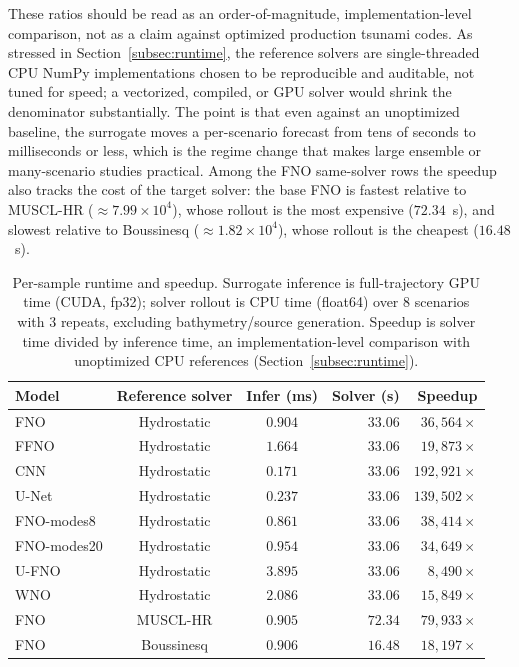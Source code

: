 These ratios should be read as an order-of-magnitude, implementation-level comparison, not as a claim against optimized production tsunami codes. As stressed in Section~\ref{subsec:runtime}, the reference solvers are single-threaded CPU NumPy implementations chosen to be reproducible and auditable, not tuned for speed; a vectorized, compiled, or GPU solver would shrink the denominator substantially. The point is that even against an unoptimized baseline, the surrogate moves a per-scenario forecast from tens of seconds to milliseconds or less, which is the regime change that makes large ensemble or many-scenario studies practical. Among the FNO same-solver rows the speedup also tracks the cost of the target solver: the base FNO is fastest relative to MUSCL-HR ($\approx 7.99 \times 10 ^ {4}$), whose rollout is the most expensive ($72.34$~s), and slowest relative to Boussinesq ($\approx 1.82 \times 10 ^ {4}$), whose rollout is the cheapest ($16.48$~s).

\begin{table}[!htbp]
\centering
\caption{Per-sample runtime and speedup. Surrogate inference is full-trajectory GPU time (CUDA, fp32); solver rollout is CPU time (float64) over $8$ scenarios with $3$ repeats, excluding bathymetry/source generation. Speedup is solver time divided by inference time, an implementation-level comparison with unoptimized CPU references (Section~\ref{subsec:runtime}).}
\label{tab:speed}
\begin{tabular}{lccrr}
    \toprule
    Model & Reference solver & Infer (ms) & Solver (s) & Speedup \\
    \midrule
    FNO         & Hydrostatic & $0.904$ & $33.06$ & $36{,}564  \times$ \\
    FFNO        & Hydrostatic & $1.664$ & $33.06$ & $19{,}873  \times$ \\
    CNN         & Hydrostatic & $0.171$ & $33.06$ & $192{,}921 \times$ \\
    U-Net       & Hydrostatic & $0.237$ & $33.06$ & $139{,}502 \times$ \\
    FNO-modes8  & Hydrostatic & $0.861$ & $33.06$ & $38{,}414  \times$ \\
    FNO-modes20 & Hydrostatic & $0.954$ & $33.06$ & $34{,}649  \times$ \\
    U-FNO       & Hydrostatic & $3.895$ & $33.06$ & $8{,}490   \times$ \\
    WNO         & Hydrostatic & $2.086$ & $33.06$ & $15{,}849  \times$ \\
    FNO         & MUSCL-HR    & $0.905$ & $72.34$ & $79{,}933  \times$ \\
    FNO         & Boussinesq  & $0.906$ & $16.48$ & $18{,}197  \times$ \\
    \bottomrule
\end{tabular}
\end{table}

